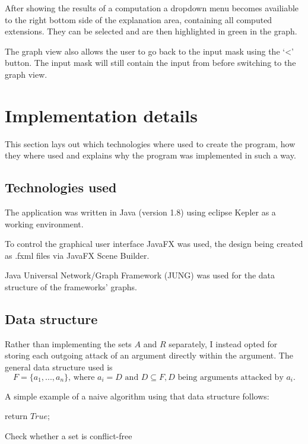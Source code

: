 \documentclass[draft,final]{vutinfth} %
\newcommand{\hl}{\par\vspace{6pt}} %
\newcommand{\cl}{\par\vspace{12pt}} %
\begin{document}
After showing the results of a computation a dropdown menu becomes availiable to the right bottom side of the explanation area, containing all computed extensions. They can be selected and are then highlighted in green in the graph.\hl
The graph view also allows the user to go back to the input mask using the `<' button. The input mask will still contain the input from before switching to the graph view.

\section{Implementation details}
This section lays out which technologies where used to create the program, how they where used and explains why the program was implemented in such a way.\cl %

\subsection{Technologies used}
The application was written in Java (version 1.8) using eclipse Kepler as a working environment.\hl
To control the graphical user interface JavaFX was used, the design being created as .fxml files via JavaFX Scene Builder.\hl
Java Universal Network/Graph Framework (JUNG) was used for the data structure of the frameworks' graphs.

\subsection{Data structure}
Rather than implementing the sets $A$ and $R$ separately, I instead opted for storing each outgoing attack of an argument directly within the argument. The general data structure used is\\
\[F=\{a_1,...,a_n\} \text{, where } a_i=D \text{ and } D\subseteq F, D \text{ being arguments attacked by } a_i.\]\hl

A simple example of a naive algorithm using that data structure follows:\hl

\begin{algorithm}[H]
 return $True$;
 \caption{Check whether a set is conflict-free}
\end{algorithm}\hl

\backmatter




\printindex

\printglossaries
\end{document}
